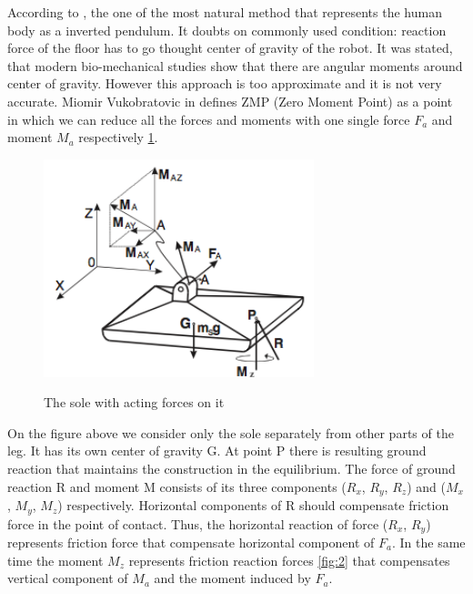 \documentclass[11pt,a4paper]{article}
\begin{document}
According to \cite{tang2008analysis}, the one of the most natural method that represents the human body as a inverted pendulum. It doubts on commonly used condition: reaction force of the floor has to go thought center of gravity of the robot. It was stated, that modern bio-mechanical studies show that there are angular moments around center of gravity. However this approach is too approximate and it is not very accurate. 
Miomir Vukobratovic in \cite{vukobratovic2004zero} defines ZMP (Zero Moment Point) as a point in which we can reduce all the forces and moments with one single force $F_a$ and moment $M_a$ respectively  \cref{fig:1}.
	
	\begin{figure}[h!]
		\vspace{-0.2cm}
		\centering
		{\includegraphics[width=0.7\textwidth]{1}}
		\caption{The sole with acting forces on it}
		\label{fig:1}
		\vspace{-0.1cm}
	\end{figure}

On the figure above we consider only the sole separately from other parts of the leg. It has its own center of gravity G. At point P there is resulting ground reaction that maintains the construction in the equilibrium. The force of ground reaction R and moment M consists of its three components ($R_x$, $R_y$, $R_z$) and ($M_x$, $M_y$, $M_z$) respectively. Horizontal components of R should compensate friction force in the point of contact. Thus, the horizontal reaction of force ($R_x$, $R_y$) represents 
friction force that compensate horizontal component of $F_a$. In the same time the moment $M_z$ represents friction reaction forces \cref{fig:2} that compensates vertical component of $M_a$ and the moment induced by $F_a$. \cite{vukobratovic2004zero}
\end{document}
